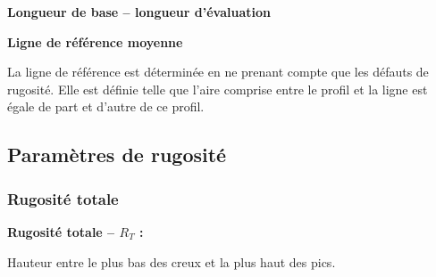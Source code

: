 \documentclass[10pt]{article}
\begin{document}
\begin{minipage}[c]{.2\linewidth}
\begin{center}
\end{center}
\end{minipage}\hfill
\begin{minipage}[c]{.75\linewidth}
\begin{defi}
\textbf{Longueur de base -- longueur d'évaluation} 

\end{defi}
\end{minipage}


\begin{minipage}[c]{.2\linewidth}
\begin{center}
\end{center}
\end{minipage}\hfill
\begin{minipage}[c]{.75\linewidth}
\begin{defi}
\textbf{Ligne de référence moyenne} 

La ligne de référence est déterminée en ne prenant compte que les défauts de rugosité. Elle est définie telle que l'aire comprise entre le profil et la ligne est égale de part et d'autre de ce profil.
\end{defi}
\end{minipage}


\subsection{Paramètres de rugosité}


\subsubsection{Rugosité totale} 
\begin{minipage}[c]{.2\linewidth}
\begin{center}
\end{center}
\end{minipage}\hfill
\begin{minipage}[c]{.75\linewidth}
\begin{defi}
\textbf{Rugosité totale -- $R_T$ :}

Hauteur entre le plus bas des creux et la plus haut des pics.

\end{defi}
\end{minipage}
\end{document}

